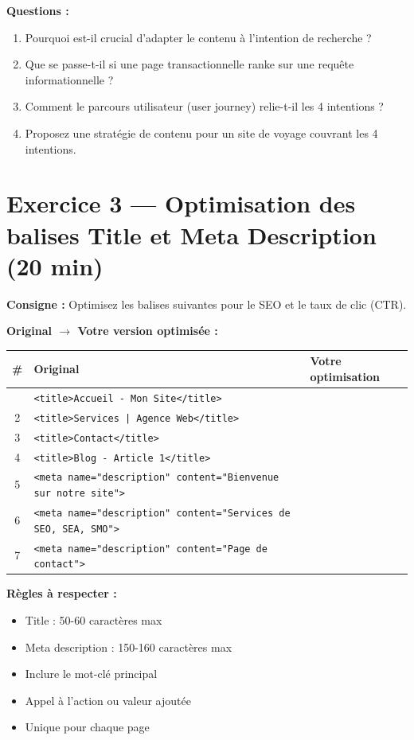 \documentclass[12pt,a4paper]{report}
\begin{document}
\textbf{Questions :}
\begin{enumerate}
    \item Pourquoi est-il crucial d'adapter le contenu \`{a} l'intention de recherche ?
    \item Que se passe-t-il si une page transactionnelle ranke sur une requ\^{e}te informationnelle ?
    \item Comment le parcours utilisateur (user journey) relie-t-il les 4 intentions ?
    \item Proposez une strat\'{e}gie de contenu pour un site de voyage couvrant les 4 intentions.
\end{enumerate}

\section{Exercice 3 --- Optimisation des balises Title et Meta Description (20 min)}

\textbf{Consigne :} Optimisez les balises suivantes pour le SEO et le taux de clic (CTR).

\textbf{Original $\rightarrow$ Votre version optimis\'{e}e :}

\begin{longtable}{cp{5cm}p{5cm}}
\toprule
\# & Original & Votre optimisation \\
\midrule
\endhead
\bottomrule
\endfoot
1 & \texttt{\textless title\textgreater Accueil - Mon Site\textless /title\textgreater} & \\
2 & \texttt{\textless title\textgreater Services | Agence Web\textless /title\textgreater} & \\
3 & \texttt{\textless title\textgreater Contact\textless /title\textgreater} & \\
4 & \texttt{\textless title\textgreater Blog - Article 1\textless /title\textgreater} & \\
5 & \texttt{\textless meta name="description" content="Bienvenue sur notre site"\textgreater} & \\
6 & \texttt{\textless meta name="description" content="Services de SEO, SEA, SMO"\textgreater} & \\
7 & \texttt{\textless meta name="description" content="Page de contact"\textgreater} & \\
\bottomrule
\end{longtable}

\textbf{R\`{e}gles \`{a} respecter :}
\begin{itemize}
    \item Title : 50-60 caract\`{e}res max
    \item Meta description : 150-160 caract\`{e}res max
    \item Inclure le mot-cl\'{e} principal
    \item Appel \`{a} l'action ou valeur ajout\'{e}e
    \item Unique pour chaque page
\end{itemize}
\end{document}

